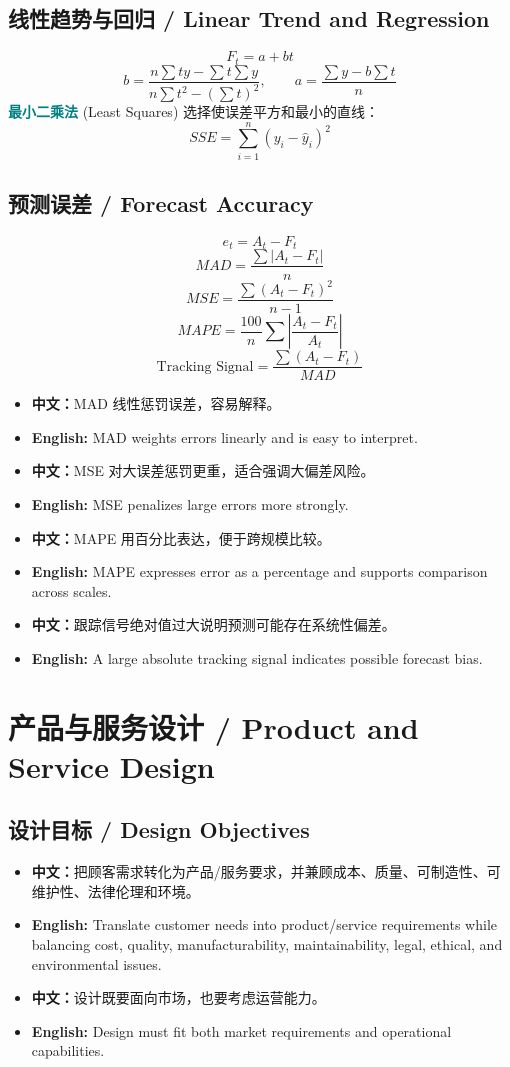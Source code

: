 \documentclass[11pt,a4paper]{ctexart}
\newcommand{\term}[2]{\textbf{\textcolor{Teal}{#1}} \textcolor{Muted}{(#2)}}
\newcommand{\cn}[1]{\textbf{中文：}#1}
\newcommand{\en}[1]{\textbf{English:} #1}
\begin{document}
\subsection{线性趋势与回归 / Linear Trend and Regression}
\[
F_t=a+bt
\]
\[
b=\frac{n\sum ty-\sum t\sum y}{n\sum t^2-(\sum t)^2},
\qquad
a=\frac{\sum y-b\sum t}{n}
\]
\term{最小二乘法}{Least Squares} 选择使误差平方和最小的直线：
\[
SSE=\sum_{i=1}^{n}(y_i-\hat{y}_i)^2
\]

\subsection{预测误差 / Forecast Accuracy}
\[
e_t=A_t-F_t
\]
\[
MAD=\frac{\sum |A_t-F_t|}{n}
\]
\[
MSE=\frac{\sum (A_t-F_t)^2}{n-1}
\]
\[
MAPE=\frac{100}{n}\sum\left|\frac{A_t-F_t}{A_t}\right|
\]
\[
\text{Tracking Signal}=\frac{\sum (A_t-F_t)}{MAD}
\]

\begin{itemize}
  \item \cn{MAD 线性惩罚误差，容易解释。}
  \item \en{MAD weights errors linearly and is easy to interpret.}
  \item \cn{MSE 对大误差惩罚更重，适合强调大偏差风险。}
  \item \en{MSE penalizes large errors more strongly.}
  \item \cn{MAPE 用百分比表达，便于跨规模比较。}
  \item \en{MAPE expresses error as a percentage and supports comparison across scales.}
  \item \cn{跟踪信号绝对值过大说明预测可能存在系统性偏差。}
  \item \en{A large absolute tracking signal indicates possible forecast bias.}
\end{itemize}

\section{产品与服务设计 / Product and Service Design}

\subsection{设计目标 / Design Objectives}
\begin{itemize}
  \item \cn{把顾客需求转化为产品/服务要求，并兼顾成本、质量、可制造性、可维护性、法律伦理和环境。}
  \item \en{Translate customer needs into product/service requirements while balancing cost, quality, manufacturability, maintainability, legal, ethical, and environmental issues.}
  \item \cn{设计既要面向市场，也要考虑运营能力。}
  \item \en{Design must fit both market requirements and operational capabilities.}
\end{itemize}
\end{document}
